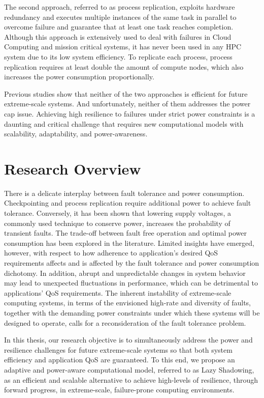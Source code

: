The second approach, referred to as process replication, exploits hardware redundancy and executes multiple instances of the same task 
in parallel to overcome failure and guarantee that at least one task reaches completion. Although this approach is extensively used 
to deal with failures in 
Cloud Computing and mission critical systems, it has 
never been used in any HPC system due to its low system efficiency. To replicate each process, process replication requires 
at least double the amount of compute nodes, which also increases the power consumption proportionally. 

Previous studies show that neither of the two approaches is efficient for future extreme-scale systems. And unfortunately, neither 
of them addresses the power cap issue. 
Achieving high resilience to failures under strict power constraints is a daunting and critical challenge that requires new 
computational models with scalability, adaptability, and power-awareness. 
 
\section{Research Overview}

There is a delicate interplay between fault tolerance and power consumption. Checkpointing and process replication require 
additional power to achieve fault tolerance. Conversely, it has been shown that lowering supply voltages, a commonly used 
technique to conserve power, increases the probability of transient faults. The trade-off between fault free operation and 
optimal power consumption has been explored in the literature. Limited insights have emerged, however, with respect to how 
adherence to application’s desired QoS requirements affects and is affected by the fault tolerance and power consumption 
dichotomy. In addition, abrupt and unpredictable changes in system behavior may lead to unexpected fluctuations in performance, 
which can be detrimental to applications’ QoS requirements. The inherent instability of extreme-scale computing systems, 
in terms of the envisioned high-rate and diversity of faults, together with the demanding power constraints under which 
these systems will be designed to operate, calls for a 
reconsideration of the fault tolerance problem.

In this thesis, our research objective is to simultaneously address the power and resilience challenges for future extreme-scale 
systems so that both system efficiency and application QoS are guaranteed.
To this end, we propose an adaptive and power-aware computational model, referred to as Lazy Shadowing, as an efficient and 
scalable alternative to achieve high-levels of resilience, through forward progress, in extreme-scale, failure-prone 
computing environments. 

